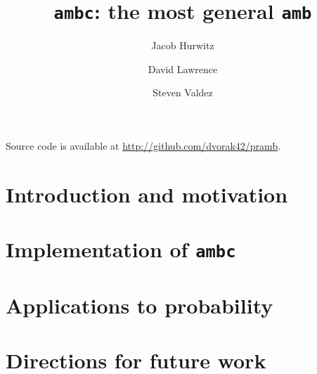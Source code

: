 \documentclass{article}
\title{\texttt{ambc}: the most general \texttt{amb}}
\author{Jacob Hurwitz \and David Lawrence \and Steven Valdez}
\begin{document}
\maketitle

\begin{center}
  Source code is available at \url{http://github.com/dvorak42/pramb}.
\end{center}

\section{Introduction and motivation}

\section{Implementation of \texttt{ambc}}

\section{Applications to probability}

\section{Directions for future work}
\end{document}
